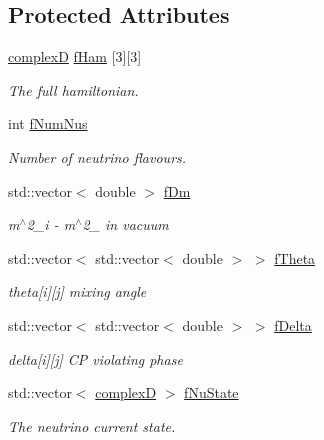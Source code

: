 \subsection*{Protected Attributes}
\begin{DoxyCompactItemize}
\item 
\hyperlink{EigenPoint_8h_a67ca8e107e20610c3fff78d5e726ece0}{complexD} \hyperlink{classOscProb_1_1PMNS__Fast_a94286a881bc53dd512a89d548346b611}{f\+Ham} \mbox{[}3\mbox{]}\mbox{[}3\mbox{]}
\begin{DoxyCompactList}\small\item\em The full hamiltonian. \end{DoxyCompactList}\item 
int \hyperlink{classOscProb_1_1PMNS__Base_a24bb74bed63569dfe88b18fa6a08060e}{f\+Num\+Nus}
\begin{DoxyCompactList}\small\item\em Number of neutrino flavours. \end{DoxyCompactList}\item 
std\+::vector$<$ double $>$ \hyperlink{classOscProb_1_1PMNS__Base_a406a31c3b5d620e5a0cace5b411f9f70}{f\+Dm}
\begin{DoxyCompactList}\small\item\em m$^\wedge$2\+\_\+i -\/ m$^\wedge$2\+\_ in vacuum \end{DoxyCompactList}\item 
std\+::vector$<$ std\+::vector$<$ double $>$ $>$ \hyperlink{classOscProb_1_1PMNS__Base_a1976887cd658dd86b2336c181f1470b4}{f\+Theta}
\begin{DoxyCompactList}\small\item\em theta\mbox{[}i\mbox{]}\mbox{[}j\mbox{]} mixing angle \end{DoxyCompactList}\item 
std\+::vector$<$ std\+::vector$<$ double $>$ $>$ \hyperlink{classOscProb_1_1PMNS__Base_ab2a5fa40e689b221c8a7d2c17213810d}{f\+Delta}
\begin{DoxyCompactList}\small\item\em delta\mbox{[}i\mbox{]}\mbox{[}j\mbox{]} CP violating phase \end{DoxyCompactList}\item 
std\+::vector$<$ \hyperlink{EigenPoint_8h_a67ca8e107e20610c3fff78d5e726ece0}{complexD} $>$ \hyperlink{classOscProb_1_1PMNS__Base_abf99f2339e3ee989600740b5d88063e8}{f\+Nu\+State}
\begin{DoxyCompactList}\small\item\em The neutrino current state. \end{DoxyCompactList}\item 

\end{DoxyCompactItemize}
